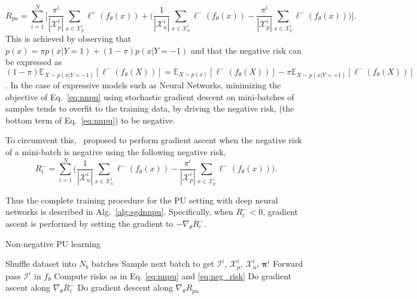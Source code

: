 \begin{equation}
  \label{eq:nnpu}
R_{pu}=\sum_{i=1}^{N}\Biggl[ \frac{\pi^{i}}{|\mathcal{X}^{i}_{p}|}\sum_{x \in \mathcal{X}^{i}_p}\ell^+(f_{\theta}(x)) +
\Biggl( \frac{1}{|\mathcal{X}^{i}_{u}|}\sum_{x \in \mathcal{X}^{i}_u}\ell^-(f_{\theta}(x)) -
\frac{\pi^{i}}{|\mathcal{X}^{i}_{p}|}\sum_{x \in \mathcal{X}^{i}_p}\ell^-(f_{\theta}(x)) \Biggr) \Biggr].
\end{equation}
This is achieved by observing that $p(x) = \pi p(x|Y=1) + (1-\pi) p(x|Y=-1)$ and that the negative risk can be expressed as $ (1-\pi) \mathbb{E}_{X \sim p(x|Y=-1)}\left[\ell^-(f_\theta(X)) \right] =
\mathbb{E}_{X \sim p(x)}\left[\ell^-(f_\theta(X)) \right] - \pi \mathbb{E}_{X \sim p(x|Y=+1)}\left[\ell^-(f_\theta(X)) \right]$. In the case of expressive models such as Neural Networks, minimizing the objective of Eq.~\eqref{eq:nnpu} using stochastic gradient descent on mini-batches of samples tends to overfit to the training data, by driving the negative risk, (\ie the bottom term of Eq.~\eqref{eq:nnpu}) to be negative.

To circumvent this,~\cite{kiryo17} proposed to perform gradient ascent when the negative risk of a mini-batch is negative using the following negative risk,
\begin{equation}
  \label{eq:neg_risk}
R_{i}^{-}=\sum_{i=1}^N\Biggl(
 \frac{1}{|\mathcal{X}^{i}_{u}|}\sum_{x \in \mathcal{X}^{i}_u}\ell^-(f_{\theta}(x)) - 
\frac{\pi^{i}}{|\mathcal{X}^{i}_{p}|}\sum_{x \in \mathcal{X}^{i}_p}\ell^-(f_{\theta}(x)) \Biggr).
\end{equation}

Thus the complete training procedure for the PU setting with deep neural networks is described in Alg.~\ref{alg:sgdnnpu}. Specifically, when \(R_{i}^{-} < 0\), gradient ascent is performed by setting the gradient to \(-\nabla_\theta R_{i}^{-}\).

\begin{algorithm}[H]
\caption{Non-negative PU learning}
\label{alg:sgdnnpu}
\begin{algorithmic}[1]
\State Shuffle dataset into $N_{b}$ batches
     \State Sample next batch to get $\mathcal{I}^i$, $\mathcal{X}_p^i$, $\mathcal{X}_u^i$, $\bm{\pi}^i$
	\State Forward pass $\mathcal{I}^i$ in $f_\theta$
	\State Compute risks as in Eq. \ref{eq:nnpu} and \ref{eq:neg_risk}
          \State Do gradient ascent along $\nabla_\theta R_{i}^{-}$
      \Else
          \State Do gradient descent along $\nabla_\theta R_{pu}$
      \EndIf
  \EndFor
\EndFor
\end{algorithmic}
\end{algorithm}

